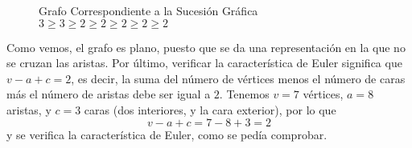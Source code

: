 \documentclass[12pt]{article}
\begin{document}
\begin{ejercicio}
        \begin{figure}[H]
            \centering
            \caption{Grafo Correspondiente a la Sucesión Gráfica $3 \ge 3 \ge 2 \ge 2 \ge 2 \ge 2 \ge 2$}
            \label{fig:ej1}
        \end{figure}

        Como vemos, el grafo es plano, puesto que se da una representación en la que no se cruzan las aristas. Por último, verificar la característica de Euler significa que $v - a + c = 2$, es decir, la suma del número de vértices menos el número de caras más el número de aristas debe ser igual a $2$.
        Tenemos $v=7$ vértices, $a = 8$ aristas, y $c=3$ caras (dos interiores, y la cara exterior), por lo que $$v - a + c = 7 - 8 + 3 = 2$$ y se verifica la característica de Euler, como se pedía comprobar.
    \end{ejercicio}
\end{document}
